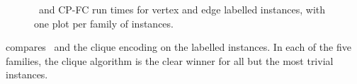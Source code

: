 \begin{figure}[htb]
{        \label{figure:mcs33ved-runtime-mcsplitdown-cpfc-bv}
    }
    \caption{\McSplitDown\ and CP-FC run times for vertex and edge labelled instances, with one plot per family of instances.}
    \label{figure:mcs33ved-runtime-mcsplitdown-cpfc-scatters}
\end{figure}


 compares \McSplitDown\ and the clique
encoding on the labelled instances.
In each of the five families, the clique algorithm
is the clear winner for all but the most trivial instances.

